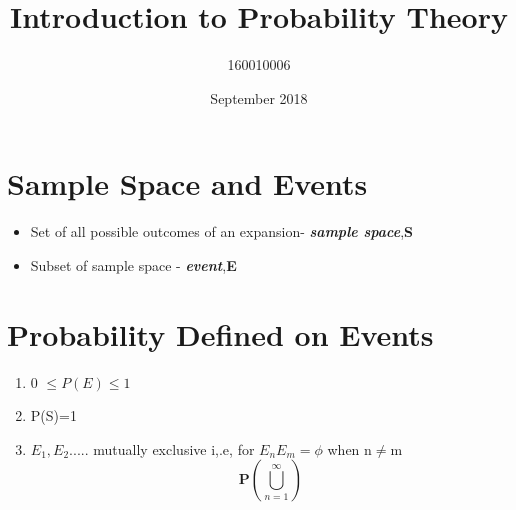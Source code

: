 \documentclass{article}
\title{Introduction to Probability Theory}
\author{160010006 }
\date{September 2018}
\begin{document}
\maketitle

\section{Sample Space and Events}
\begin{itemize}
\item Set of all possible outcomes of an expansion- \textbf{\textit{sample space}},\textbf{S}
\item Subset of sample space - \textbf{\textit{event}},\textbf{E}
\end{itemize}
\section{Probability Defined on Events}
\begin{enumerate}
\item  0  $\leq P(E)  \leq 1$
\item  P(S)=1
  \item  $E_{1},E_{2}.....$  mutually exclusive i,.e, for $E_{n}E_{m}=\phi$  when n$\neq$m \begin{equation}\textbf{P}\left(\bigcup_{n=1}^{\infty}\right) \end{equation}
\end{enumerate}
\end{document}
